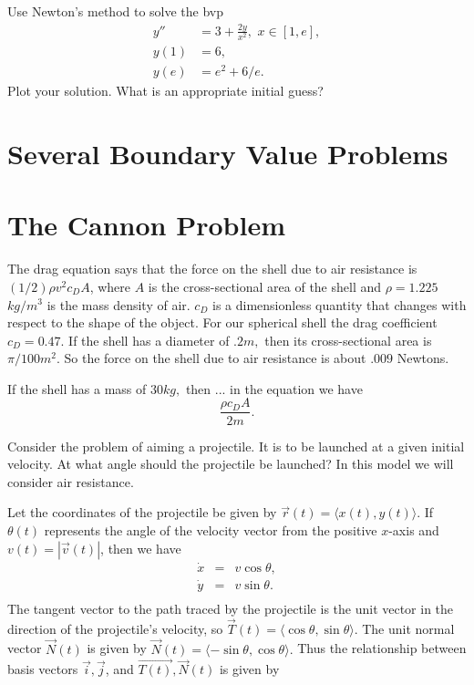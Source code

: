 \begin{problem}
Use Newton's method to solve the bvp
\begin{equation*}
\begin{split}
y'' &= 3 + \frac{2y}{x^2}, \,\, x \in [1,e],\\
y(1) &= 6, \\
y(e) &= e^2 + 6/e.
\end{split}
\end{equation*}
Plot your solution. What is an appropriate initial guess? 
\end{problem}

\pagebreak

\section{Several Boundary Value Problems}

\section*{The Cannon Problem}

The drag equation says that the force on the shell due to air resistance is $(1/2)\rho v^2 c_D A$, where $A$ is the cross-sectional area of the shell and $\rho= 1.225$ $kg/m^3$ is the mass density of air. $c_D$ is a dimensionless quantity that changes with respect to the shape of the object. For our spherical shell the drag coefficient $c_D = 0.47.$ If the shell has a diameter of $.2 m,$ then its cross-sectional area is $\pi/100 m^2$. So the force on the shell due to air 
resistance is about $.009$ Newtons.


If the shell has a mass of $30 kg,$ then ... in the equation we have
\[\frac{\rho c_D A}{2 m}.\]

Consider the problem of aiming a projectile. It is to be launched at a given initial velocity. At what angle should the projectile be launched? In this model we will consider air resistance. 

Let the coordinates of the projectile be given by $\vec{r}(t) = \langle x(t), y(t) \rangle.$ If $\theta(t)$ represents the angle of the velocity vector from the positive $x$-axis and $v(t) = |\vec{v}(t) |$, then we have 
\begin{eqnarray*}
\dot{x} &=& v\cos{\theta},\\
\dot{y} &=& v\sin{\theta}.\\
\end{eqnarray*}
The tangent vector to the path traced by the projectile is the unit vector in the direction of the projectile's velocity, so $\vec{T}(t) = \langle \cos{\theta}, \sin{\theta} \rangle.$ The unit normal vector $\vec{N} (t)$ is given by $\vec{N} (t)= \langle -\sin{\theta}, \cos{\theta} \rangle.$ Thus the relationship between basis vectors $\vec{i}, \vec{j}$, and $\vec{T(t)}, \vec{N}(t)$ is given by 

